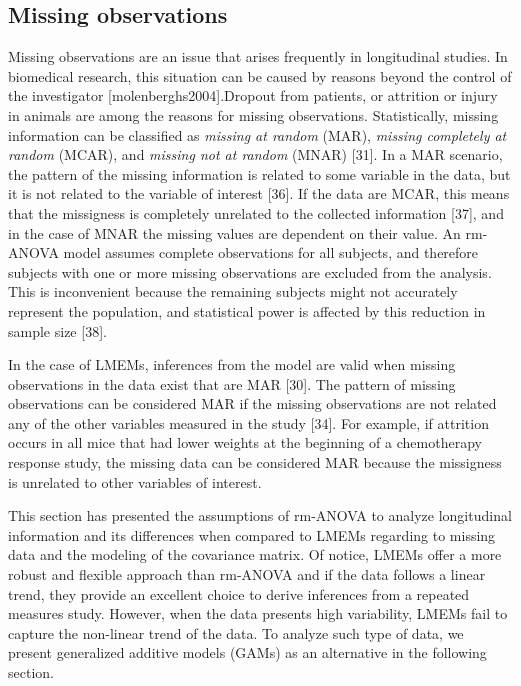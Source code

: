 \documentclass[
]{article}
\begin{document}
\hypertarget{missing-observations}{%
\subsection{Missing observations}\label{missing-observations}}

Missing observations are an issue that arises frequently in longitudinal studies. In biomedical research, this situation can be caused by reasons beyond the control of the investigator {[}molenberghs2004{]}.Dropout from patients, or attrition or injury in animals are among the reasons for missing observations. Statistically, missing information can be classified as \emph{missing at random} (MAR), \emph{missing completely at random} (MCAR), and \emph{missing not at random} (MNAR) {[}31{]}. In a MAR scenario, the pattern of the missing information is related to some variable in the data, but it is not related to the variable of interest {[}36{]}. If the data are MCAR, this means that the missigness is completely unrelated to the collected information {[}37{]}, and in the case of MNAR the missing values are dependent on their value. An rm-ANOVA model assumes complete observations for all subjects, and therefore subjects with one or more missing observations are excluded from the analysis. This is inconvenient because the remaining subjects might not accurately represent the population, and statistical power is affected by this reduction in sample size {[}38{]}.

In the case of LMEMs, inferences from the model are valid when missing observations in the data exist that are MAR {[}30{]}. The pattern of missing observations can be considered MAR if the missing observations are not related any of the other variables measured in the study {[}34{]}. For example, if attrition occurs in all mice that had lower weights at the beginning of a chemotherapy response study, the missing data can be considered MAR because the missigness is unrelated to other variables of interest.

This section has presented the assumptions of rm-ANOVA to analyze longitudinal information and its differences when compared to LMEMs regarding to missing data and the modeling of the covariance matrix. Of notice, LMEMs offer a more robust and flexible approach than rm-ANOVA and if the data follows a linear trend, they provide an excellent choice to derive inferences from a repeated measures study. However, when the data presents high variability, LMEMs fail to capture the non-linear trend of the data. To analyze such type of data, we present generalized additive models (GAMs) as an alternative in the following section.
\end{document}

